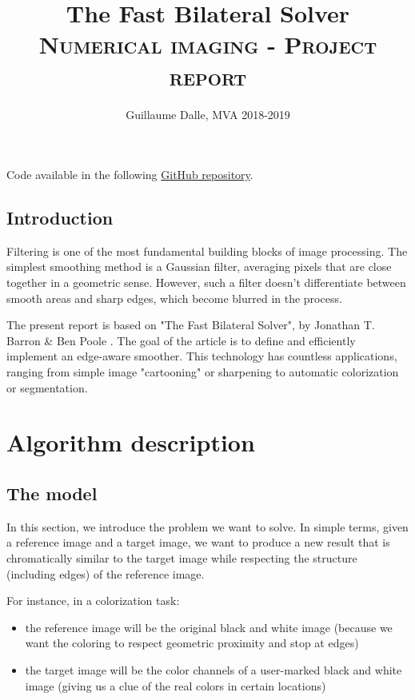 \documentclass{article}
\title{\textbf{The Fast Bilateral Solver}
\\
\textsc{Numerical imaging - Project report}}
\author{Guillaume Dalle, MVA 2018-2019}
\date{}
\begin{document}
\maketitle

\tableofcontents

\vspace{1cm}

Code available in the following \textcolor{blue}{\href{https://github.com/gdalle/TheFastBilateralSolver}{GitHub repository}}.

\newpage

\subsection*{Introduction}

Filtering is one of the most fundamental building blocks of image processing. The simplest smoothing method is a Gaussian filter, averaging pixels that are close together in a geometric sense. However, such a filter doesn't differentiate between smooth areas and sharp edges, which become blurred in the process.

The present report is based on "The Fast Bilateral Solver", by Jonathan T. Barron \& Ben Poole \cite{barron_fast_2016}.
The goal of the article is to define and efficiently implement an edge-aware smoother. This technology has countless applications, ranging from simple image "cartooning" or sharpening to automatic colorization or segmentation.

\section{Algorithm description}

\subsection{The model}

In this section, we introduce the problem we want to solve. In simple terms, given a reference image and a target image, we want to produce a new result that is chromatically similar to the target image while respecting the structure (including edges) of the reference image.

For instance, in a colorization task:
\begin{itemize}
    \item the reference image will be the original black and white image (because we want the coloring to respect geometric proximity and stop at edges)
    \item the target image will be the color channels of a user-marked black and white image (giving us a clue of the real colors in certain locations)
\end{itemize}
\end{document}
